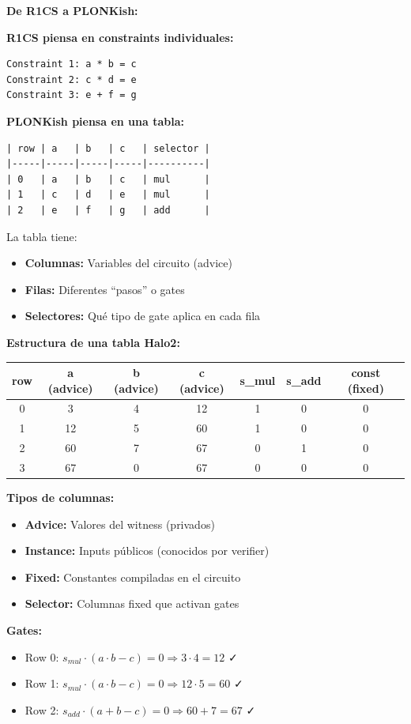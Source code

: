 \documentclass[11pt,a4paper,twoside,openright]{book}
\theoremstyle{definition}
\theoremstyle{plain}
\theoremstyle{remark}
\begin{document}
\begin{intuicion}
\textbf{De R1CS a PLONKish:}

\textbf{R1CS piensa en constraints individuales:}
\begin{verbatim}
Constraint 1: a * b = c
Constraint 2: c * d = e
Constraint 3: e + f = g
\end{verbatim}

\textbf{PLONKish piensa en una tabla:}
\begin{verbatim}
| row | a   | b   | c   | selector |
|-----|-----|-----|-----|----------|
| 0   | a   | b   | c   | mul      |
| 1   | c   | d   | e   | mul      |
| 2   | e   | f   | g   | add      |
\end{verbatim}

La tabla tiene:
\begin{itemize}
    \item \textbf{Columnas:} Variables del circuito (advice)
    \item \textbf{Filas:} Diferentes ``pasos'' o gates
    \item \textbf{Selectores:} Qué tipo de gate aplica en cada fila
\end{itemize}
\end{intuicion}

\begin{mathnote}
\textbf{Estructura de una tabla Halo2:}

\begin{center}
\begin{tabular}{|c|c|c|c|c|c|c|}
\hline
\textbf{row} & \textbf{a (advice)} & \textbf{b (advice)} & \textbf{c (advice)} & \textbf{s\_mul} & \textbf{s\_add} & \textbf{const (fixed)} \\
\hline
0 & 3 & 4 & 12 & 1 & 0 & 0 \\
1 & 12 & 5 & 60 & 1 & 0 & 0 \\
2 & 60 & 7 & 67 & 0 & 1 & 0 \\
3 & 67 & 0 & 67 & 0 & 0 & 0 \\
\hline
\end{tabular}
\end{center}

\textbf{Tipos de columnas:}
\begin{itemize}
    \item \textbf{Advice:} Valores del witness (privados)
    \item \textbf{Instance:} Inputs públicos (conocidos por verifier)
    \item \textbf{Fixed:} Constantes compiladas en el circuito
    \item \textbf{Selector:} Columnas fixed que activan gates
\end{itemize}

\textbf{Gates:}
\begin{itemize}
    \item Row 0: $s_{mul} \cdot (a \cdot b - c) = 0 \Rightarrow 3 \cdot 4 = 12$ ✓
    \item Row 1: $s_{mul} \cdot (a \cdot b - c) = 0 \Rightarrow 12 \cdot 5 = 60$ ✓
    \item Row 2: $s_{add} \cdot (a + b - c) = 0 \Rightarrow 60 + 7 = 67$ ✓
\end{itemize}
\end{mathnote}
\end{document}
